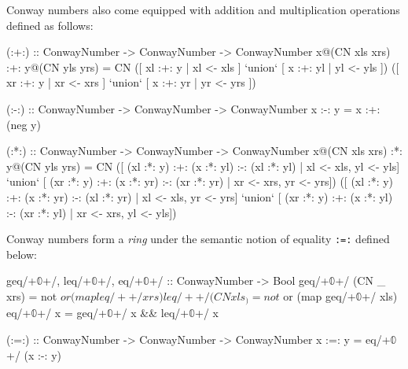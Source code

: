 \documentclass[authoryear,preprint]{sigplanconf}
\newcommand{\zerog}{$\mathbb{0}$}
\begin{document}
Conway numbers also come equipped with addition and multiplication operations
defined as follows:

\begin{code}
(:+:) :: ConwayNumber -> ConwayNumber -> ConwayNumber
x@(CN xls xrs) :+: y@(CN yls yrs) = 
  CN 
    ([ xl :+: y | xl <- xls ] `union`
     [ x :+: yl | yl <- yls ])
    ([ xr :+: y | xr <- xrs ] `union`
     [ x :+: yr | yr <- yrs ])

(:-:) :: ConwayNumber -> ConwayNumber -> ConwayNumber
x :-: y = x :+: (neg y) 

(:*:) :: ConwayNumber -> ConwayNumber -> ConwayNumber
x@(CN xls xrs) :*: y@(CN yls yrs) = 
  CN 
    ([ (xl :*: y) :+: (x :*: yl) :-: (xl :*: yl)
     | xl <- xls, yl <- yls] `union`
     [ (xr :*: y) :+: (x :*: yr) :-: (xr :*: yr)
     | xr <- xrs, yr <- yrs])
    ([ (xl :*: y) :+: (x :*: yr) :-: (xl :*: yr)
     | xl <- xls, yr <- yrs] `union`
     [ (xr :*: y) :+: (x :*: yl) :-: (xr :*: yl)
     | xr <- xrs, yl <- yls])
\end{code}

Conway numbers form a \emph{ring} under the semantic notion of equality
\lstinline$:=:$ defined below:
\begin{code}
geq/+\zerog+/, leq/+\zerog+/, eq/+\zerog+/ :: ConwayNumber -> Bool
geq/+\zerog+/ (CN _ xrs)  = not $ or (map leq/+\zerog+/ xrs) 
leq/+\zerog+/ (CN xls _)  = not $ or (map geq/+\zerog+/ xls) 
eq/+\zerog+/ x            = geq/+\zerog+/ x && leq/+\zerog+/ x 

(:=:) :: ConwayNumber -> ConwayNumber -> ConwayNumber
x :=: y = eq/+\zerog+/ (x :-: y)
\end{code}



\softraggedright

\end{document}
